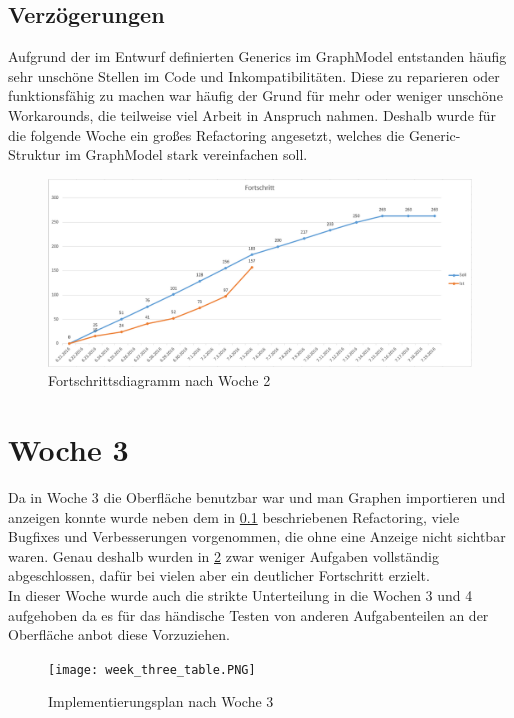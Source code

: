 \subsection{Verzögerungen}
\label{sec:delay_week2}
Aufgrund der im Entwurf definierten Generics im GraphModel entstanden häufig sehr unschöne Stellen im Code und Inkompatibilitäten. Diese zu reparieren oder funktionsfähig zu machen war häufig der Grund für mehr oder weniger unschöne Workarounds, die teilweise viel Arbeit in Anspruch nahmen. Deshalb wurde für die folgende Woche ein großes Refactoring angesetzt, welches die Generic-Struktur im GraphModel stark vereinfachen soll.
\begin{figure}[!htbp]
	\centering
	\includegraphics[width=380pt]{resourcen/week_two_diagram.PNG}
	\caption{Fortschrittsdiagramm nach Woche 2}
	\label{fig:week_two_diagram}
\end{figure}

\newpage

\section{Woche 3}
Da in Woche 3 die Oberfläche benutzbar war und man Graphen importieren und anzeigen konnte wurde neben dem in \ref{sec:delay_week2} beschriebenen Refactoring, viele Bugfixes und Verbesserungen vorgenommen, die ohne eine Anzeige nicht sichtbar waren. Genau deshalb wurden in \ref{fig:week_three_table} zwar weniger Aufgaben vollständig abgeschlossen, dafür bei vielen aber ein deutlicher Fortschritt erzielt. \\
In dieser Woche wurde auch die strikte Unterteilung in die Wochen 3 und 4 aufgehoben da es für das händische Testen von anderen Aufgabenteilen an der Oberfläche anbot diese Vorzuziehen.
\begin{figure}[!htbp]
	\centering
	\texttt{[image: week\_three\_table.PNG]}
	\caption{Implementierungsplan nach Woche 3}
	\label{fig:week_three_table}
\end{figure}
